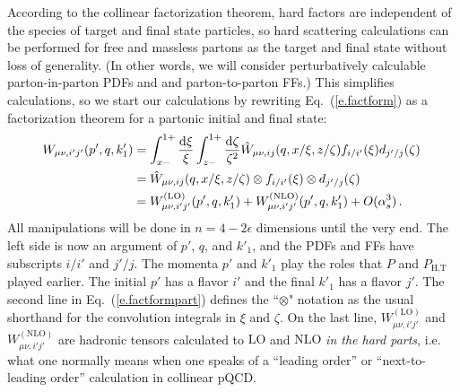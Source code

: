 \documentclass[prd,preprintnumbers,nofootinbib,superscriptaddress,onecolumn,preprint]{revtex4-1}
\newcommand{\THDsc}[1]{#1_{\text{H,T}}}
\newcommand\3[1]{\boldsymbol{#1}}
\newcommand{\eref}[1]{Eq.~(\ref{e.#1})}
\begin{document}
According to the collinear factorization theorem, hard factors are
independent of the species of target and final state particles, so
hard scattering calculations can be performed for free and massless
partons as the target and final state without loss of generality.
(In other words, we will consider perturbatively calculable parton-in-parton PDFs and 
and parton-to-parton FFs.)
This simplifies calculations, so we start our calculations by
rewriting \eref{factform} as a factorization theorem for a partonic
initial and final state:
%
\begin{align}
W_{\mu \nu,i'j'}(p',q,k'_1) 
&{} = 
\int_{x-}^{1+} \frac{\diff{\xi}}{\xi} 
\int_{z-}^{1+} \frac{\diff{\zeta}}{\zeta^2} 
\hat{W}_{\mu \nu, ij}(q,x/\xi,z/\zeta) 
f_{i/i'}(\xi) d_{j'/j}(\zeta) 
\, \nonumber \\
&{}=  
\hat{W}_{\mu \nu, ij}(q,x/\xi,z/\zeta) \otimes
f_{i/i'}(\xi) \otimes d_{j'/j}(\zeta) 
\, \nonumber \\ 
&{}=  W^{(\text{LO})}_{\mu \nu,i'j'}(p',q,k'_1) 
+ W^{(\text{NLO})}_{\mu \nu,i'j'}(p',q,k'_1) 
+ O(\alpha_s^3) \, .
\label{e.factformpart}
\end{align}
%
All manipulations will be done in $n = 4 - 2 \epsilon$ dimensions
until the very end.  The left side is now an argument of $p'$, $q$,
and $k'_1$, and the PDFs and FFs have subscripts $i/i'$ and $j'/j$.
The momenta $p'$ and $k'_1$ play the roles that $P$ and $\THDsc{P}$
played earlier.  The initial $p'$ has a flavor $i'$ and the final
$k'_1$ has a flavor $j'$.  The second line in \eref{factformpart}
defines the ``$\otimes$" notation as the usual shorthand for the
convolution integrals in $\xi$ and $\zeta$. On the last line,
$W^{(\text{LO})}_{\mu \nu,i'j'}$ and $W^{(\text{NLO})}_{\mu \nu,i'j'}$
are hadronic tensors calculated to $\text{LO}$ and $\text{NLO}$
\emph{in the hard parts}, i.e. what one normally means when one speaks
of a ``leading order'' or ``next-to-leading order'' calculation in
collinear pQCD.
\end{document}
